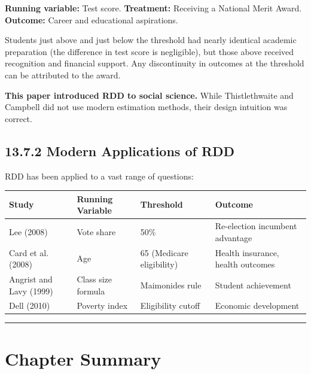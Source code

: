\textbf{Running variable:} Test score.  
\textbf{Treatment:} Receiving a National Merit Award.  
\textbf{Outcome:} Career and educational aspirations.

Students just above and just below the threshold had nearly identical academic preparation (the difference in test score is negligible), but those above received recognition and financial support. Any discontinuity in outcomes at the threshold can be attributed to the award.

\textbf{This paper introduced RDD to social science.} While Thistlethwaite and Campbell did not use modern estimation methods, their design intuition was correct.

\subsection{13.7.2 Modern Applications of RDD}

RDD has been applied to a vast range of questions:

\begin{center}
\begin{tabular}{@{} l l l l @{}}
\toprule
\textbf{Study} & \textbf{Running Variable} & \textbf{Threshold} & \textbf{Outcome} \\
\midrule
Lee (2008) & Vote share & 50\% & Re-election incumbent advantage \\
Card et al. (2008) & Age & 65 (Medicare eligibility) & Health insurance, health outcomes \\
Angrist and Lavy (1999) & Class size formula & Maimonides rule & Student achievement \\
Dell (2010) & Poverty index & Eligibility cutoff & Economic development \\
\bottomrule
\end{tabular}
\end{center}

\medskip\hrule\medskip

\section{Chapter Summary}


